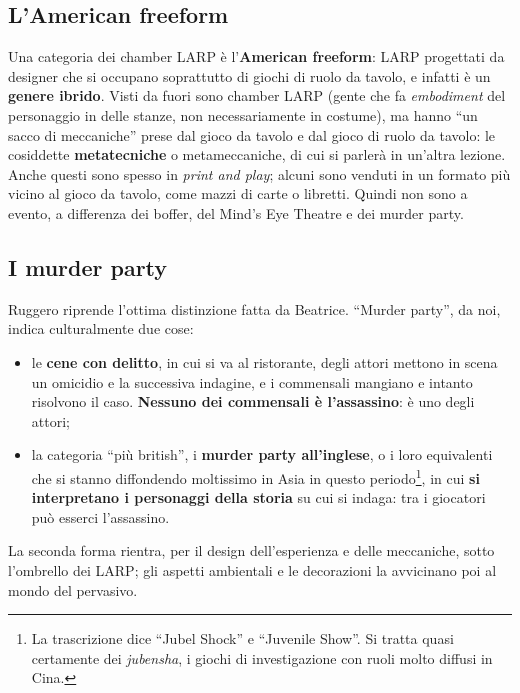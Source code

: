 \subsection{L'American freeform}

Una categoria dei chamber LARP è l'\textbf{American freeform}: LARP progettati da
designer che si occupano soprattutto di giochi di ruolo da tavolo, e infatti è
un \textbf{genere ibrido}. Visti da fuori sono chamber LARP (gente che fa
\emph{embodiment} del personaggio in delle stanze, non necessariamente in
costume), ma hanno ``un sacco di meccaniche'' prese dal gioco da tavolo e dal
gioco di ruolo da tavolo: le cosiddette \textbf{metatecniche} o metameccaniche,
di cui si parlerà in un'altra lezione. Anche questi sono spesso in \emph{print
and play}; alcuni sono venduti in un formato più vicino al gioco da tavolo, come
mazzi di carte o libretti. Quindi non sono a evento, a differenza dei boffer,
del Mind's Eye Theatre e dei murder party.

\subsection{I murder party}

Ruggero riprende l'ottima distinzione fatta da Beatrice. ``Murder party'', da noi,
indica culturalmente due cose:
\begin{itemize}
  \item le \textbf{cene con delitto}, in cui si va al ristorante, degli attori
        mettono in scena un omicidio e la successiva indagine, e i commensali
        mangiano e intanto risolvono il caso. \textbf{Nessuno dei commensali è
        l'assassino}: è uno degli attori;
  \item la categoria ``più british'', i \textbf{murder party all'inglese}, o i
        loro equivalenti che si stanno diffondendo moltissimo in Asia in questo
        periodo\footnote{La trascrizione dice ``Jubel Shock'' e ``Juvenile
        Show''. Si tratta quasi certamente dei \emph{jubensha}, i giochi di
        investigazione con ruoli molto diffusi in Cina.}, in cui \textbf{si
        interpretano i personaggi della storia} su cui si indaga: tra i giocatori
        può esserci l'assassino.
\end{itemize}
La seconda forma rientra, per il design dell'esperienza e delle meccaniche,
sotto l'ombrello dei LARP; gli aspetti ambientali e le decorazioni la
avvicinano poi al mondo del pervasivo.


